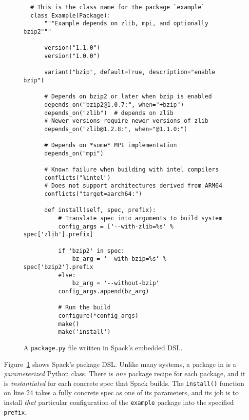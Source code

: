 \begin{figure}
\begin{verbatim}
  # This is the class name for the package `example`
  class Example(Package):
      """Example depends on zlib, mpi, and optionally bzip2"""

      version("1.1.0")
      version("1.0.0")

      variant("bzip", default=True, description="enable bzip")

      # Depends on bzip2 or later when bzip is enabled
      depends_on("bzip2@1.0.7:", when="+bzip")
      depends_on("zlib")  # depends on zlib
      # Newer versions require newer versions of zlib
      depends_on("zlib@1.2.8:", when="@1.1.0:")

      # Depends on *some* MPI implementation
      depends_on("mpi")

      # Known failure when building with intel compilers
      conflicts("%intel")
      # Does not support architectures derived from ARM64
      conflicts("target=aarch64:")

      def install(self, spec, prefix):
          # Translate spec into arguments to build system
          config_args = ['--with-zlib=%s' % spec['zlib'].prefix]

          if 'bzip2' in spec:
              bz_arg = '--with-bzip=%s' % spec['bzip2'].prefix
          else:
              bz_arg = '--without-bzip'
          config_args.append(bz_arg)

          # Run the build
          configure(*config_args)
          make()
          make('install')
\end{verbatim}
\caption{
  A {\tt package.py} file written in Spack's embedded DSL.
  \label{fig:example-spack-package}
  \vspace{-3em}
}
\end{figure}

Figure~\ref{fig:example-spack-package} shows Spack's package DSL. Unlike many systems, a
package in \spack is a {\it parameterized} Python class. There is {\it one} package
recipe for each package, and it is {\it instantiated} for each concrete spec that Spack
builds. The {\tt install()} function on line 24 takes a fully concrete spec as one of
its parameters, and its job is to install {\it that} particular configuration of the
{\tt example} package into the specified {\tt prefix}.

